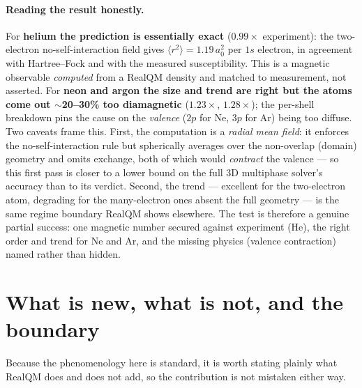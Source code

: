 \documentclass[11pt]{article}
\begin{document}
\paragraph{Reading the result honestly.} For \textbf{helium the prediction is essentially exact} ($0.99\times$
experiment): the two-electron no-self-interaction field gives $\langle r^2\rangle=1.19\,a_0^2$ per $1s$ electron,
in agreement with Hartree--Fock and with the measured susceptibility. This is a magnetic observable
\emph{computed} from a RealQM density and matched to measurement, not asserted. For \textbf{neon and argon the
size and trend are right but the atoms come out $\sim$20--30\% too diamagnetic} ($1.23\times$, $1.28\times$); the
per-shell breakdown pins the cause on the \emph{valence} ($2p$ for Ne, $3p$ for Ar) being too diffuse. Two
caveats frame this. First, the computation is a \emph{radial mean field}: it enforces the no-self-interaction rule
but spherically averages over the non-overlap (domain) geometry and omits exchange, both of which would
\emph{contract} the valence --- so this first pass is closer to a lower bound on the full 3D multiphase solver's
accuracy than to its verdict. Second, the trend --- excellent for the two-electron atom, degrading for the
many-electron ones absent the full geometry --- is the same regime boundary RealQM shows elsewhere. The test is
therefore a genuine partial success: one magnetic number secured against experiment (He), the right order and
trend for Ne and Ar, and the missing physics (valence contraction) named rather than hidden.

\section{What is new, what is not, and the boundary}

Because the phenomenology here is standard, it is worth stating plainly what RealQM does and does not add, so the
contribution is not mistaken either way.
\end{document}
